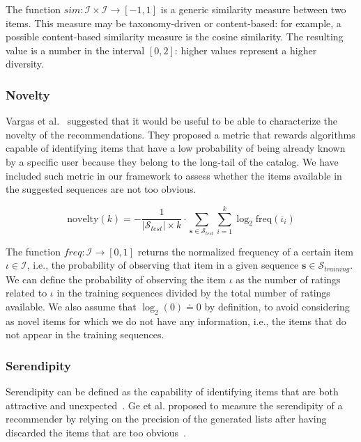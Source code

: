 The function $sim : \mathcal{I} \times \mathcal{I} \to [-1, 1]$ is a generic similarity measure between two items. This measure may be taxonomy-driven or content-based: for example, a possible content-based similarity measure is the cosine similarity. The resulting value is a number in the interval $[0, 2]$: higher values represent a higher diversity.

\subsubsection{Novelty}

Vargas et al.~\cite{Vargas2011} suggested that it would be useful to be able to characterize the novelty of the recommendations. They proposed a metric that rewards algorithms capable of identifying items that have a low probability of being already known by a specific user because they belong to the long-tail of the catalog. We have included such metric in our framework to assess whether the items available in the suggested sequences are not too obvious.

\begin{equation}
\mathrm{novelty}(k) = - \frac{1}{|\mathcal{S}_{test}| \times k} \cdot \sum_{\mathbf{s} \in \mathcal{S}_{test}} \sum_{i = 1}^{k} \log_2 \mathrm{freq}(\overline{\iota}_i)
\end{equation}

The function $freq : \mathcal{I} \to [0, 1]$ returns the normalized frequency of a certain item $\iota \in \mathcal{I}$, i.e., the probability of observing that item in a given sequence $\mathbf{s} \in \mathcal{S}_{training}$. We can define the probability of observing the item $\iota$ as the number of ratings related to $\iota$ in the training sequences divided by the total number of ratings available. We also assume that $\log_2(0) \doteq 0$ by definition, to avoid considering as novel items for which we do not have any information, i.e., the items that do not appear in the training sequences.

\subsubsection{Serendipity}

Serendipity can be defined as the capability of identifying items that are both attractive and unexpected~\cite{Gemmis2015b}. Ge et al. proposed to measure the serendipity of a recommender by relying on the precision of the generated lists after having discarded the items that are too obvious~\cite{Ge2010}.

